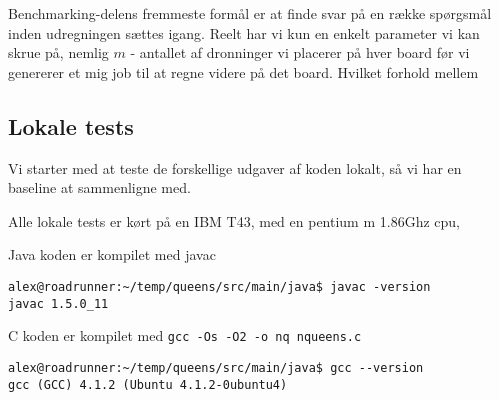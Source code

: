 Benchmarking-delens fremmeste formål er at finde svar på en række spørgsmål
inden udregningen sættes igang.  Reelt har vi kun en enkelt parameter vi kan
skrue på, nemlig $m$ - antallet af dronninger vi placerer på hver board før vi
genererer et mig job til at regne videre på det board.  Hvilket forhold mellem 


\subsection{Lokale tests}

Vi starter med at teste de forskellige udgaver af koden lokalt, så vi har en
baseline at sammenligne med.

Alle lokale tests er kørt på en IBM T43, med en pentium m 1.86Ghz cpu, 

Java koden er kompilet med javac

\begin{verbatim}
alex@roadrunner:~/temp/queens/src/main/java$ javac -version
javac 1.5.0_11
\end{verbatim}

C koden er kompilet med \texttt{gcc -Os -O2 -o nq nqueens.c}

\begin{verbatim}
alex@roadrunner:~/temp/queens/src/main/java$ gcc --version
gcc (GCC) 4.1.2 (Ubuntu 4.1.2-0ubuntu4)
\end{verbatim}


